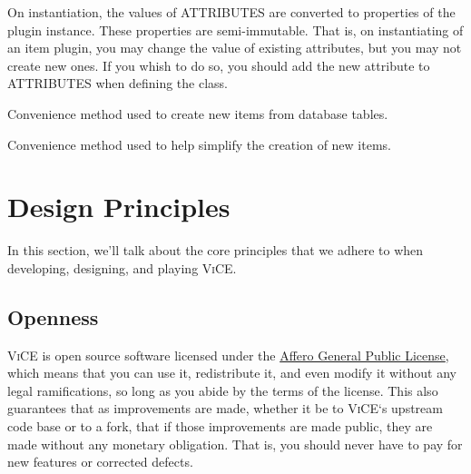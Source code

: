 \documentclass[letterpaper,10pt,english]{sphinxmanual}
\begin{document}
\begin{fulllineitems}
On instantiation, the values of ATTRIBUTES are converted to properties
of the plugin instance. These properties are semi-immutable. That is,
on instantiating of an item plugin, you may change the value of existing
attributes, but you may not create new ones. If you whish to do so, you
should add the new attribute to ATTRIBUTES when defining the class.

\begin{fulllineitems}
\label{api_reference:vice.plugins.items.Item.fromTable}
Convenience method used to create new items from database tables.

\end{fulllineitems}


\begin{fulllineitems}
\label{api_reference:vice.plugins.items.Item.new}
Convenience method used to help simplify the creation of new items.

\end{fulllineitems}


\end{fulllineitems}



\chapter{Design Principles}
\label{index:design-principles}
In this section, we'll talk about the core principles that we adhere to when
developing, designing, and playing \textsc{ViCE}.


\section{Openness}
\label{index:openness}
\textsc{ViCE} is open source software licensed under
the \href{http://www.gnu.org/licenses/agpl-3.0.html}{Affero General Public License},
which means that you can use it, redistribute it, and even modify it without
any legal ramifications, so long as you abide by the terms of the license.
This also guarantees that as improvements are made, whether it be to
\textsc{ViCE}`s upstream code base or to a fork, that
if those improvements are made public, they are made without any monetary
obligation. That is, you should never have to pay for new features or corrected defects.
\end{document}

